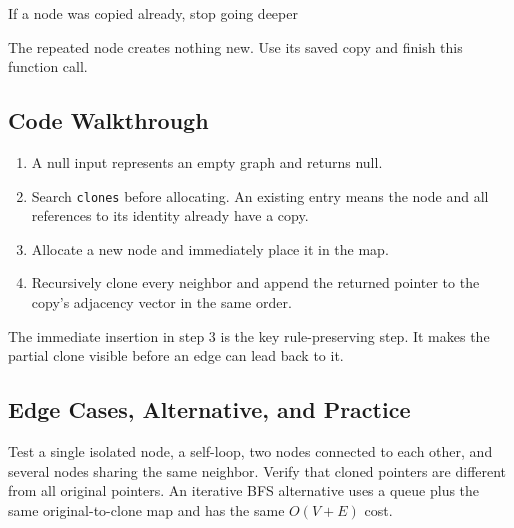 \begin{visualbox}{If a node was copied already, stop going deeper}
\centering
{}

\smallskip
The repeated node creates nothing new. Use its saved copy and finish this
function call.
\end{visualbox}

\subsection{Code Walkthrough}
\begin{enumerate}
  \item A null input represents an empty graph and returns null.
  \item Search \texttt{clones} before allocating. An existing entry means the
  node and all references to its identity already have a copy.
  \item Allocate a new node and immediately place it in the map.
  \item Recursively clone every neighbor and append the returned pointer to
  the copy's adjacency vector in the same order.
\end{enumerate}

The immediate insertion in step 3 is the key rule-preserving step. It makes
the partial clone visible before an edge can lead back to it.

\subsection{Edge Cases, Alternative, and Practice}
Test a single isolated node, a self-loop, two nodes connected to each other,
and several nodes sharing the same neighbor. Verify that cloned pointers are
different from all original pointers. An iterative BFS alternative uses a
queue plus the same original-to-clone map and has the same \(O(V+E)\) cost.

